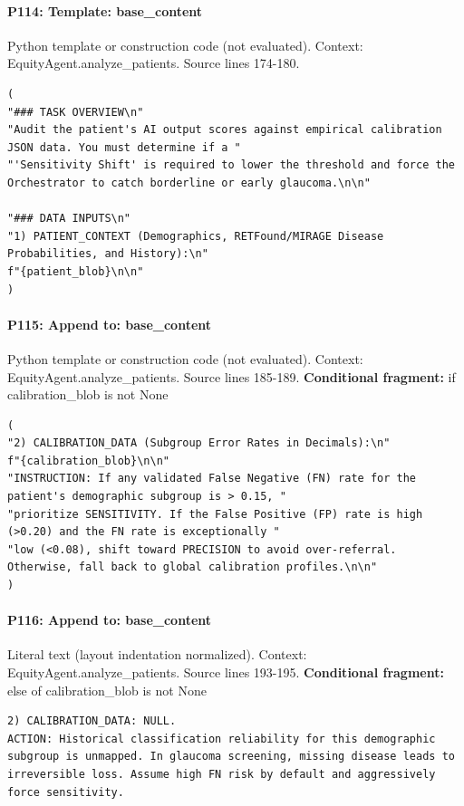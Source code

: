 \documentclass[10pt]{article}
\begin{document}
\paragraph{P114: Template: base\_content}
Python template or construction code (not evaluated). Context: EquityAgent.analyze\_patients. Source lines 174-180.
\begin{Verbatim}
(
"### TASK OVERVIEW\n"
"Audit the patient's AI output scores against empirical calibration JSON data. You must determine if a "
"'Sensitivity Shift' is required to lower the threshold and force the Orchestrator to catch borderline or early glaucoma.\n\n"

"### DATA INPUTS\n"
"1) PATIENT_CONTEXT (Demographics, RETFound/MIRAGE Disease Probabilities, and History):\n"
f"{patient_blob}\n\n"
)
\end{Verbatim}
\paragraph{P115: Append to: base\_content}
Python template or construction code (not evaluated). Context: EquityAgent.analyze\_patients. Source lines 185-189.
\textbf{Conditional fragment:} if calibration\_blob is not None
\begin{Verbatim}
(
"2) CALIBRATION_DATA (Subgroup Error Rates in Decimals):\n"
f"{calibration_blob}\n\n"
"INSTRUCTION: If any validated False Negative (FN) rate for the patient's demographic subgroup is > 0.15, "
"prioritize SENSITIVITY. If the False Positive (FP) rate is high (>0.20) and the FN rate is exceptionally "
"low (<0.08), shift toward PRECISION to avoid over-referral. Otherwise, fall back to global calibration profiles.\n\n"
)
\end{Verbatim}
\paragraph{P116: Append to: base\_content}
Literal text (layout indentation normalized). Context: EquityAgent.analyze\_patients. Source lines 193-195.
\textbf{Conditional fragment:} else of calibration\_blob is not None
\begin{Verbatim}
2) CALIBRATION_DATA: NULL.
ACTION: Historical classification reliability for this demographic subgroup is unmapped. In glaucoma screening, missing disease leads to irreversible loss. Assume high FN risk by default and aggressively force sensitivity.
\end{Verbatim}
\end{document}
